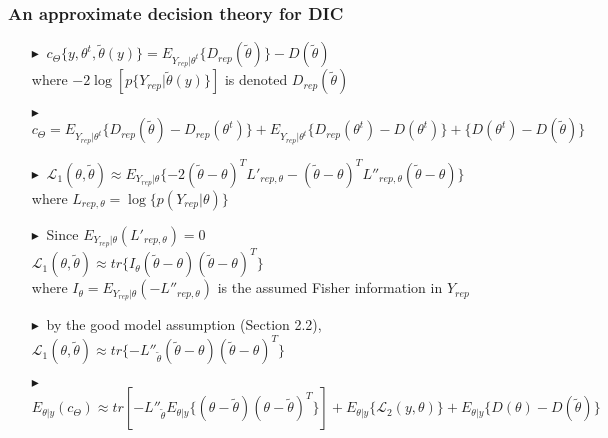 \documentclass[9pt]{beamer}  %
\newcommand{\bluetri}{\textcolor{Beaverblue}{$\blacktriangleright \ $}}
\begin{document}
\begin{frame}[t]
\frametitle{An approximate decision theory for DIC}

\begin{itemize}
    \item[\bluetri] $c_{\Theta}\{y, \theta^t, \tilde{\theta}(y)\} = E_{Y_{rep}|\theta^t}\{D_{rep}(\tilde{\theta})\} - D(\tilde{\theta})$ \\ where $-2\log[p\{Y_{rep}|\tilde{\theta}(y)\}]$ is denoted $ D_{rep}(\tilde{\theta})$
    \vspace{0.2cm}
    \item[\bluetri] $c_{\Theta} = E_{Y_{rep}|\theta^t}\{D_{rep}(\tilde{\theta})-D_{rep}(\theta^t)\} + E_{Y_{rep}|\theta^t}\{D_{rep}(\theta^t)-D(\theta^t)\} + \{D(\theta^t)-D(\tilde{\theta})\}$
    \vspace{0.2cm}
    \item[\bluetri] $\mathcal{L}_1(\theta,\tilde{\theta}) \approx E_{Y_{rep}|\theta}\{-2(\tilde{\theta}-\theta)^TL'_{rep,\theta}-(\tilde{\theta}-\theta)^TL''_{rep,\theta}(\tilde{\theta}-\theta)\}$ \\ where $L_{rep,\theta} = \log\{p(Y_{rep}|\theta)\}$
    \vspace{0.2cm}
    \item[\bluetri] Since $E_{Y_{rep}|\theta}(L'_{rep,\theta}) = 0$ \\
    $\mathcal{L}_1(\theta,\tilde{\theta}) \approx tr\{I_{\theta}(\tilde{\theta}-\theta)(\tilde{\theta}-\theta)^T\}$ \\ where $I_{\theta} = E_{Y_{rep}|\theta}(-L''_{rep,\theta})$ is the assumed Fisher information in $Y_{rep}$
    \vspace{0.2cm}
    \item[\bluetri] by the good model assumption (Section 2.2), \\
    $\mathcal{L}_1(\theta,\tilde{\theta}) \approx tr\{-L''_{\tilde{\theta}}(\tilde{\theta}-\theta)(\tilde{\theta}-\theta)^T\}$
    \vspace{0.2cm}
    \item[\bluetri] $E_{\theta|y}(c_{\Theta}) \approx tr[-L''_{\tilde{\theta}}E_{\theta|y}\{(\theta-\tilde{\theta})(\theta-\tilde{\theta})^T\}] + E_{\theta|y}\{\mathcal{L}_2(y,\theta)\} + E_{\theta|y}\{D(\theta)-D(\tilde{\theta})\}$
\end{itemize}


\end{frame}
\end{document}
